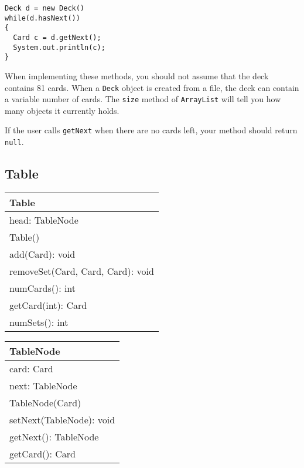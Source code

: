 \documentclass[11pt]{article}
\begin{document}
\begin{itemize}
{\footnotesize
\begin{verbatim}
Deck d = new Deck()
while(d.hasNext())
{
  Card c = d.getNext();
  System.out.println(c);
}
\end{verbatim}}

  When implementing these methods, you should not assume that the deck contains
  81 cards.  When a {\tt Deck} object is created from a file, the deck can
  contain a variable number of cards. The {\tt size} method of {\tt ArrayList}
  will tell you how many objects it currently holds.

  If the user calls {\tt getNext} when there are no cards left, your method
  should return {\tt null}.

\end{itemize}

\subsection*{Table}

\begin{tabular}{|l|}
\hline
Table \\
\hline
head: TableNode\\
\hline
Table() \\
add(Card): void \\
removeSet(Card, Card, Card): void \\
numCards(): int \\
getCard(int): Card \\
numSets(): int \\
\hline
\end{tabular}
\hspace{.5in}
\begin{tabular}{|l|}
\hline
TableNode \\
\hline
card: Card\\
next: TableNode\\
\hline
TableNode(Card)\\
setNext(TableNode): void\\
getNext(): TableNode\\
getCard(): Card\\
\hline
\end{tabular}
\end{document}
